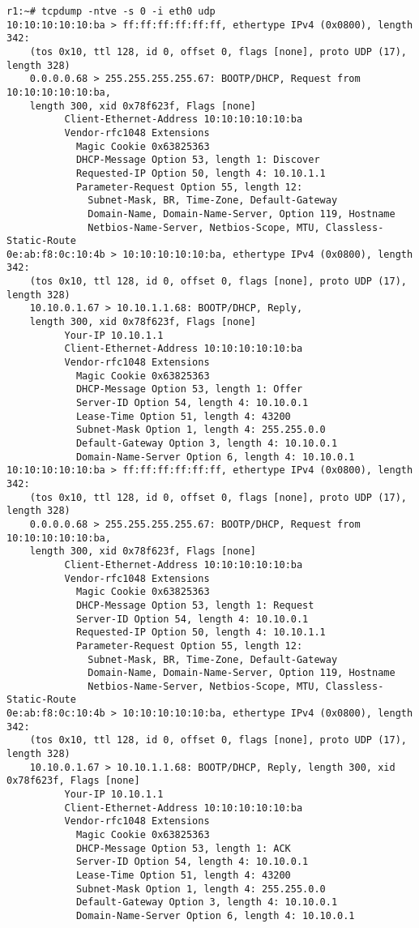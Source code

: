 \documentclass[a4paper,12pt]{article}
\begin{document}
\begin{Verbatim}
r1:~# tcpdump -ntve -s 0 -i eth0 udp
10:10:10:10:10:ba > ff:ff:ff:ff:ff:ff, ethertype IPv4 (0x0800), length 342:
	(tos 0x10, ttl 128, id 0, offset 0, flags [none], proto UDP (17), length 328)
	0.0.0.0.68 > 255.255.255.255.67: BOOTP/DHCP, Request from 10:10:10:10:10:ba,
	length 300, xid 0x78f623f, Flags [none]
          Client-Ethernet-Address 10:10:10:10:10:ba
          Vendor-rfc1048 Extensions
            Magic Cookie 0x63825363
            DHCP-Message Option 53, length 1: Discover
            Requested-IP Option 50, length 4: 10.10.1.1
            Parameter-Request Option 55, length 12:
              Subnet-Mask, BR, Time-Zone, Default-Gateway
              Domain-Name, Domain-Name-Server, Option 119, Hostname
              Netbios-Name-Server, Netbios-Scope, MTU, Classless-Static-Route
0e:ab:f8:0c:10:4b > 10:10:10:10:10:ba, ethertype IPv4 (0x0800), length 342:
	(tos 0x10, ttl 128, id 0, offset 0, flags [none], proto UDP (17), length 328)
	10.10.0.1.67 > 10.10.1.1.68: BOOTP/DHCP, Reply,
	length 300, xid 0x78f623f, Flags [none]
          Your-IP 10.10.1.1
          Client-Ethernet-Address 10:10:10:10:10:ba
          Vendor-rfc1048 Extensions
            Magic Cookie 0x63825363
            DHCP-Message Option 53, length 1: Offer
            Server-ID Option 54, length 4: 10.10.0.1
            Lease-Time Option 51, length 4: 43200
            Subnet-Mask Option 1, length 4: 255.255.0.0
            Default-Gateway Option 3, length 4: 10.10.0.1
            Domain-Name-Server Option 6, length 4: 10.10.0.1
10:10:10:10:10:ba > ff:ff:ff:ff:ff:ff, ethertype IPv4 (0x0800), length 342:
	(tos 0x10, ttl 128, id 0, offset 0, flags [none], proto UDP (17), length 328)
	0.0.0.0.68 > 255.255.255.255.67: BOOTP/DHCP, Request from 10:10:10:10:10:ba,
	length 300, xid 0x78f623f, Flags [none]
          Client-Ethernet-Address 10:10:10:10:10:ba
          Vendor-rfc1048 Extensions
            Magic Cookie 0x63825363
            DHCP-Message Option 53, length 1: Request
            Server-ID Option 54, length 4: 10.10.0.1
            Requested-IP Option 50, length 4: 10.10.1.1
            Parameter-Request Option 55, length 12:
              Subnet-Mask, BR, Time-Zone, Default-Gateway
              Domain-Name, Domain-Name-Server, Option 119, Hostname
              Netbios-Name-Server, Netbios-Scope, MTU, Classless-Static-Route
0e:ab:f8:0c:10:4b > 10:10:10:10:10:ba, ethertype IPv4 (0x0800), length 342:
	(tos 0x10, ttl 128, id 0, offset 0, flags [none], proto UDP (17), length 328)
	10.10.0.1.67 > 10.10.1.1.68: BOOTP/DHCP, Reply, length 300, xid 0x78f623f, Flags [none]
          Your-IP 10.10.1.1
          Client-Ethernet-Address 10:10:10:10:10:ba
          Vendor-rfc1048 Extensions
            Magic Cookie 0x63825363
            DHCP-Message Option 53, length 1: ACK
            Server-ID Option 54, length 4: 10.10.0.1
            Lease-Time Option 51, length 4: 43200
            Subnet-Mask Option 1, length 4: 255.255.0.0
            Default-Gateway Option 3, length 4: 10.10.0.1
            Domain-Name-Server Option 6, length 4: 10.10.0.1
\end{Verbatim}
\end{document}
